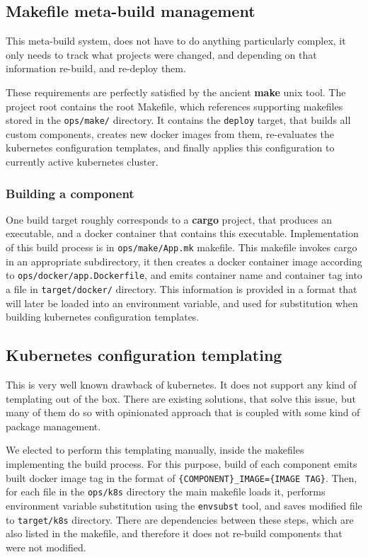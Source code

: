 \subsection{Makefile meta-build management}
This meta-build system, does not have to do anything particularly complex, it only needs to track what projects
were changed, and depending on that information re-build, and re-deploy them.

These requirements are perfectly satisfied by the ancient \textbf{make} unix tool.
The project root contains the root Makefile, which references supporting makefiles stored in the \verb|ops/make/| directory.
It contains the \verb|deploy| target, that builds all custom components, creates new docker images from them,
re-evaluates the kubernetes configuration templates, and finally applies this configuration to currently active kubernetes cluster.


\subsubsection{Building a component}
One build target roughly corresponds to a \textbf{cargo} project, that produces an executable, and a docker container
that contains this executable. Implementation of this build process is in \verb|ops/make/App.mk| makefile. This makefile
invokes cargo in an appropriate subdirectory, it then creates a docker container image according to \verb|ops/docker/app.Dockerfile|,
and emits container name and container tag into a file in \verb|target/docker/| directory. This information is provided in a format
that will later be loaded into an environment variable, and used for substitution when building kubernetes
configuration templates.

\subsection{Kubernetes configuration templating}
This is very well known drawback of kubernetes. It does not support any kind of templating out of the box.
There are existing solutions, that solve this issue, but many of them do so with opinionated approach that is coupled
with some kind of package management.

We elected to perform this templating manually, inside the makefiles implementing the build process. For this purpose,
build of each component emits built docker image tag in the format of \verb|{COMPONENT}_IMAGE={IMAGE TAG}|.
Then, for each file in the \verb|ops/k8s| directory
the main makefile loads it, performs environment variable substitution using the \verb|envsubst| tool, and saves modified
file to \verb|target/k8s| directory. There are dependencies between these steps, which are also listed in the makefile, and
therefore it does not re-build components that were not modified.

